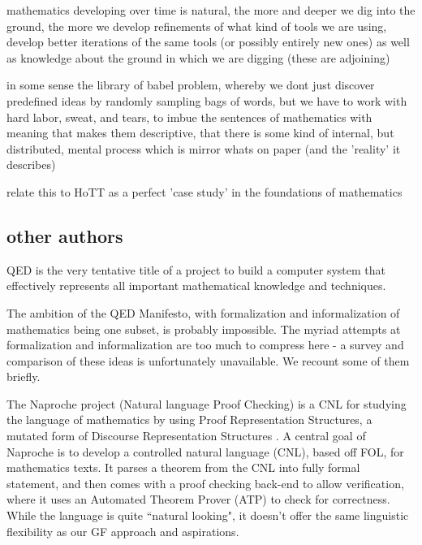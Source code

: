 mathematics developing over time is natural, the more and deeper we dig into the
ground, the more we develop refinements of what kind of tools we are using,
develop better iterations of the same tools (or possibly entirely new ones) as
well as knowledge about the ground in which we are digging (these are adjoining)

in some sense the library of babel problem, whereby we dont just discover
predefined ideas by randomly sampling bags of words, but we have to work with
hard labor, sweat, and tears, to imbue the sentences of mathematics with meaning
that makes them descriptive, that there is some kind of internal, but
distributed, mental process which is mirror whats on paper (and the 'reality' it
describes)

relate this to HoTT as a perfect 'case study' in the foundations of mathematics


\subsection{other authors}

\begin{displayquote}
QED is the very tentative title of a project to build a computer system that effectively represents all important mathematical knowledge and techniques.
\cite{godel1994qed} 
\end{displayquote}

The ambition of the QED Manifesto, with formalization and informalization of
mathematics being one subset, is probably impossible. The myriad attempts
at formalization and informalization are too much to compress here - a survey
and comparison of these ideas is unfortunately unavailable. We recount some of
them briefly.

The Naproche project (Natural language Proof Checking) is a CNL for studying the
language of mathematics by using Proof Representation Structures, a mutated form
of Discourse Representation Structures \cite{cramer2009naproche}. A central
goal of Naproche is to develop a controlled natural language (CNL), based off FOL, for
mathematics texts. It parses a theorem from the CNL into fully formal
statement, and then comes with a proof checking back-end to allow verification,
where it uses an Automated Theorem Prover (ATP) to check for correctness.
While the language is quite ``natural looking", it doesn't offer the same
linguistic flexibility as our GF approach and aspirations.

